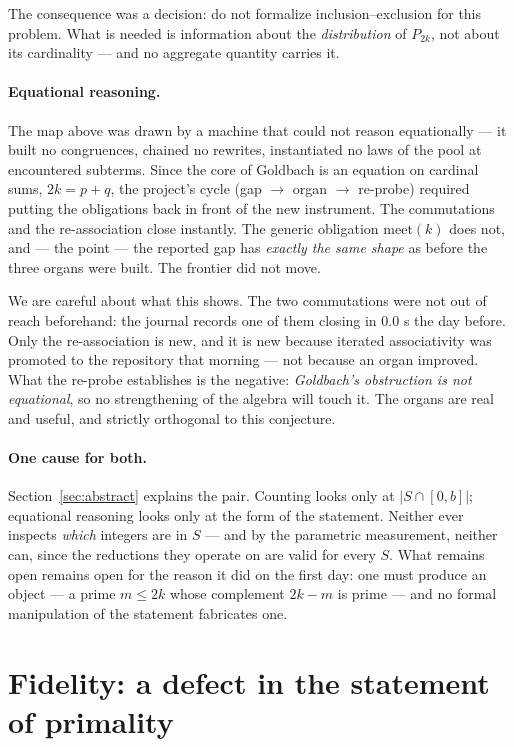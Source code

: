 \documentclass[11pt]{article}
\theoremstyle{remark}\newtheorem{remark}{Remark}
\begin{document}
The consequence was a decision: do not formalize inclusion--exclusion for this problem.
What is needed is information about the \emph{distribution} of $P_{2k}$, not about its
cardinality --- and no aggregate quantity carries it.

\paragraph{Equational reasoning.} The map above was drawn by a machine that could not
reason equationally --- it built no congruences, chained no rewrites, instantiated no
laws of the pool at encountered subterms. Since the core of Goldbach is an equation on
cardinal sums, $2k = p+q$, the project's cycle (gap $\rightarrow$ organ $\rightarrow$
re-probe) required putting the obligations back in front of the new instrument. The
commutations and the re-association close instantly. The generic obligation
$\mathrm{meet}(k)$ does not, and --- the point --- the reported gap has \emph{exactly the
same shape} as before the three organs were built. The frontier did not move.

We are careful about what this shows. The two commutations were not out of reach
beforehand: the journal records one of them closing in $0.0$ s the day before. Only the
re-association is new, and it is new because iterated associativity was promoted to the
repository that morning --- not because an organ improved. What the re-probe establishes
is the negative: \emph{Goldbach's obstruction is not equational}, so no strengthening of
the algebra will touch it. The organs are real and useful, and strictly orthogonal to
this conjecture.

\paragraph{One cause for both.} Section~\ref{sec:abstract} explains the pair. Counting
looks only at $|S \cap [0,b]|$; equational reasoning looks only at the form of the
statement. Neither ever inspects \emph{which} integers are in $S$ --- and by the
parametric measurement, neither can, since the reductions they operate on are valid for
every $S$. What remains open remains open for the reason it did on the first day: one
must produce an object --- a prime $m \le 2k$ whose complement $2k-m$ is prime --- and no
formal manipulation of the statement fabricates one.

\section{Fidelity: a defect in the statement of primality}
\label{sec:fidelity}
\end{document}
